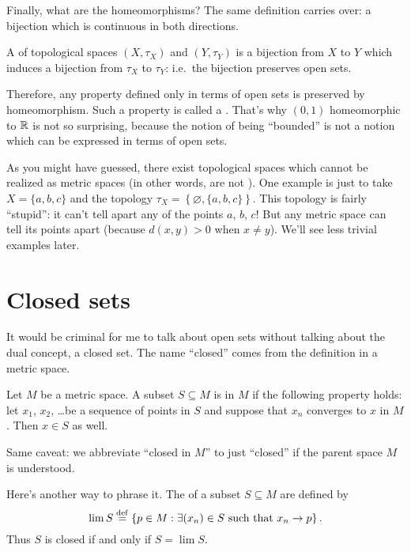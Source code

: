 
Finally, what are the homeomorphisms?
The same definition carries over: a bijection which is continuous in both directions.
\begin{definition}
	A  of topological spaces $(X, \tau_X)$ and $(Y, \tau_Y)$
	is a bijection from $X$ to $Y$
	which induces a bijection from $\tau_X$ to $\tau_Y$:
	i.e.\ the bijection preserves open sets.
\end{definition}
Therefore, any property defined only in terms of open sets is preserved by homeomorphism.
Such a property is called a .
That's why $(0,1)$ homeomorphic to $\mathbb R$ is not so surprising,
because the notion of being ``bounded'' is not a notion
which can be expressed in terms of open sets.

\begin{remark}
	As you might have guessed, there exist topological spaces which cannot be realized
	as metric spaces (in other words, are not ).
	One example is just to take $X = \{a,b,c\}$ and the topology
	$\tau_X = \left\{ \varnothing, \{a,b,c\} \right\}$.
	This topology is fairly ``stupid'':
	it can't tell apart any of the points $a$, $b$, $c$!
	But any metric space can tell its points apart (because $d(x,y) > 0$ when $x \neq y$).
	We'll see less trivial examples later.
\end{remark}


\section{Closed sets}
It would be criminal for me to talk about open sets without talking about the dual concept, a closed set.
The name ``closed'' comes from the definition in a metric space.
\begin{definition}
	Let $M$ be a metric space.
	A subset $S \subseteq M$ is  in $M$ if the following property holds:
	let $x_1$, $x_2$, \dots be a sequence of points in $S$
	and suppose that $x_n$ converges to $x$ in $M$.
	Then $x \in S$ as well.
\end{definition}
\begin{abuse}
	Same caveat: we abbreviate ``closed in $M$'' to just ``closed''
	if the parent space $M$ is understood.
\end{abuse}
Here's another way to phrase it.
The  of a subset $S \subseteq M$ are defined by
\[ \lim S \overset{\mathrm{def}}{=} \left\{ p \in M : \exists (x_n) \in S \text{ such that } x_n \to p \right\}. \]
Thus $S$ is closed if and only if $S = \lim S$.

